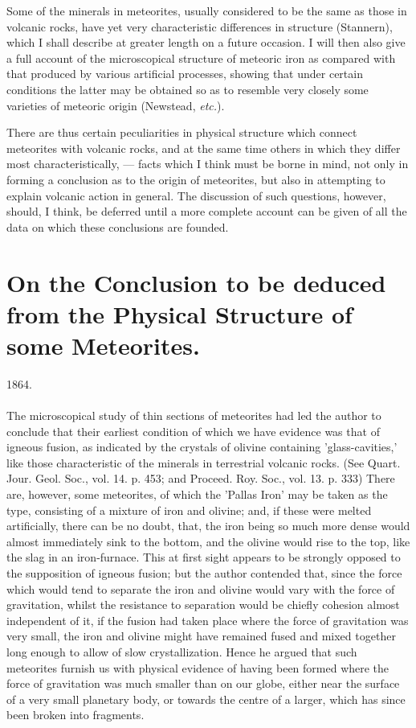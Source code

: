 \documentclass[a4paper, 12pt, oneside]{article}
\begin{document}
Some of the minerals in meteorites, usually considered to be the same as those in volcanic rocks, have yet very characteristic differences in structure (Stannern), which I shall describe at greater length on a future occasion. I will then also give a full account of the microscopical structure of meteoric iron as compared with that produced by various artificial processes, showing that under certain conditions the latter may be obtained so as to resemble very closely some varieties of meteoric origin (Newstead, \emph{etc.}).

There are thus certain peculiarities in physical structure which connect meteorites with volcanic rocks, and at the same time others in which they differ most characteristically, --- facts which I think must be borne in mind, not only in forming a conclusion as to the origin of meteorites, but also in attempting to explain volcanic action in general. The discussion of such questions, however, should, I think, be deferred until a more complete account can be given of all the data on which these conclusions are founded.
\clearpage
\section{On the Conclusion to be deduced from the Physical Structure of some Meteorites.}
\begin{center}
1864.
\end{center}
\paragraph{}
The microscopical study of thin sections of meteorites had led the author to conclude that their earliest condition of which we have evidence was that of igneous fusion, as indicated by the crystals of olivine containing 'glass-cavities,' like those characteristic of the minerals in terrestrial volcanic rocks. (See Quart. Jour. Geol. Soc., vol. 14. p. 453; and Proceed. Roy. Soc., vol. 13. p. 333) There are, however, some meteorites, of which the 'Pallas Iron' may be taken as the type, consisting of a mixture of iron and olivine; and, if these were melted artificially, there can be no doubt, that, the iron being so much more dense would almost immediately sink to the bottom, and the olivine would rise to the top, like the slag in an iron-furnace. This at first sight appears to be strongly opposed to the supposition of igneous fusion; but the author contended that, since the force which would tend to separate the iron and olivine would vary with the force of gravitation, whilst the resistance to separation would be chiefly cohesion almost independent of it, if the fusion had taken place where the force of gravitation was very small, the iron and olivine might have remained fused and mixed together long enough to allow of slow crystallization. Hence he argued that such meteorites furnish us with physical evidence of having been formed where the force of gravitation was much smaller than on our globe, either near the surface of a very small planetary body, or towards the centre of a larger, which has since been broken into fragments.
\clearpage
\end{document}
